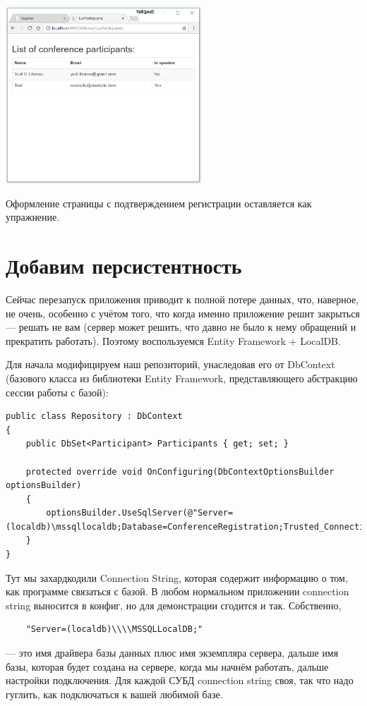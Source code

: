 \documentclass[a5paper]{article}
\begin{document}
\begin{center}
	\includegraphics[width=0.55\textwidth]{styledListParticipants.png}
\end{center}

Оформление страницы с подтверждением регистрации оставляется как упражнение.

\section{Добавим персистентность}

Сейчас перезапуск приложения приводит к полной потере данных, что, наверное, не очень, особенно с учётом того, что когда именно приложение решит закрыться --- решать не вам (сервер может решить, что давно не было к нему обращений и прекратить работать). Поэтому воспользуемся
Entity Framework + LocalDB.

Для начала модифицируем наш репозиторий, унаследовав его от DbContext (базового класса из библиотеки Entity Framework, представляющего абстракцию сессии работы с базой):

\begin{scriptsize}
	\begin{verbatim}
public class Repository : DbContext
{
    public DbSet<Participant> Participants { get; set; }

    protected override void OnConfiguring(DbContextOptionsBuilder optionsBuilder)
    {
        optionsBuilder.UseSqlServer(@"Server=(localdb)\mssqllocaldb;Database=ConferenceRegistration;Trusted_Connection=True;");
    }
}
	\end{verbatim}
\end{scriptsize}

Тут мы захардкодили Connection String, которая содержит информацию о том, как программе связаться с базой. В любом нормальном приложении connection string выносится в конфиг, но для демонстрации сгодится и так. Собственно, 
\begin{verbatim}
	"Server=(localdb)\\\\MSSQLLocalDB;"
\end{verbatim} 
--- это имя драйвера базы данных плюс имя экземпляра сервера, дальше имя базы, которая будет создана на сервере, когда мы начнём работать, дальше настройки подключения. Для каждой СУБД connection string своя, так что надо гуглить, как подключаться к вашей любимой базе.
\end{document}
